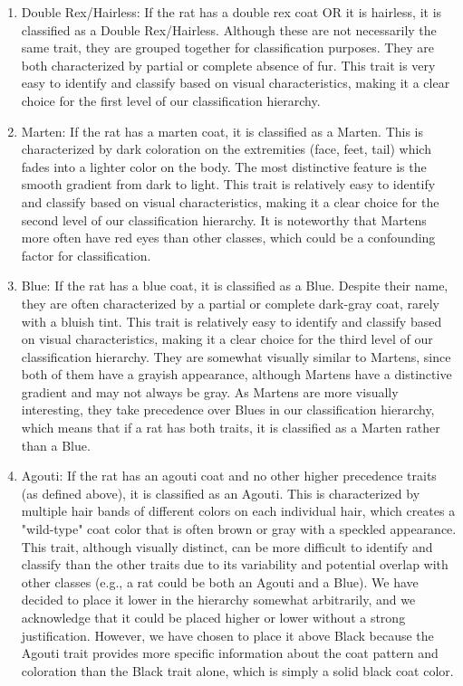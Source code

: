 \documentclass[conference]{IEEEtran}
\begin{document}
\begin{enumerate}
    \item Double Rex/Hairless: If the rat has a double rex coat OR it is hairless, it is classified as a Double Rex/Hairless. Although these are not necessarily the same trait, they are grouped together for classification purposes. They are both characterized by partial or complete absence of fur. This trait is very easy to identify and classify based on visual characteristics, making it a clear choice for the first level of our classification hierarchy.
    \item Marten: If the rat has a marten coat, it is classified as a Marten. This is characterized by dark coloration on the extremities (face, feet, tail) which fades into a lighter color on the body. The most distinctive feature is the smooth gradient from dark to light. This trait is relatively easy to identify and classify based on visual characteristics, making it a clear choice for the second level of our classification hierarchy. It is noteworthy that Martens more often have red eyes than other classes, which could be a confounding factor for classification.
    \item Blue: If the rat has a blue coat, it is classified as a Blue. Despite their name, they are often characterized by a partial or complete dark-gray coat, rarely with a bluish tint. This trait is relatively easy to identify and classify based on visual characteristics, making it a clear choice for the third level of our classification hierarchy. They are somewhat visually similar to Martens, since both of them have a grayish appearance, although Martens have a distinctive gradient and may not always be gray. As Martens are more visually interesting, they take precedence over Blues in our classification hierarchy, which means that if a rat has both traits, it is classified as a Marten rather than a Blue.
    \item Agouti: If the rat has an agouti coat and no other higher precedence traits (as defined above), it is classified as an Agouti. This is characterized by multiple hair bands of different colors on each individual hair, which creates a "wild-type" coat color that is often brown or gray with a speckled appearance. This trait, although visually distinct, can be more difficult to identify and classify than the other traits due to its variability and potential overlap with other classes (e.g., a rat could be both an Agouti and a Blue). We have decided to place it lower in the hierarchy somewhat arbitrarily, and we acknowledge that it could be placed higher or lower without a strong justification. However, we have chosen to place it above Black because the Agouti trait provides more specific information about the coat pattern and coloration than the Black trait alone, which is simply a solid black coat color.

\end{enumerate}
\end{document}
